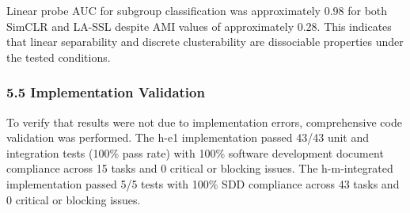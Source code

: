 Linear probe AUC for subgroup classification was approximately 0.98 for both SimCLR and LA-SSL despite AMI values of approximately 0.28. This indicates that linear separability and discrete clusterability are dissociable properties under the tested conditions.

\subsubsection{5.5 Implementation Validation}

To verify that results were not due to implementation errors, comprehensive code validation was performed. The h-e1 implementation passed 43/43 unit and integration tests (100\% pass rate) with 100\% software development document compliance across 15 tasks and 0 critical or blocking issues. The h-m-integrated implementation passed 5/5 tests with 100\% SDD compliance across 43 tasks and 0 critical or blocking issues.
